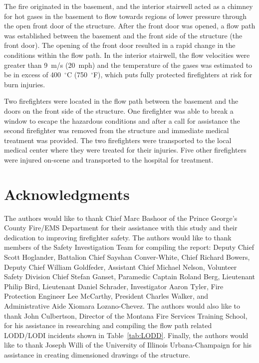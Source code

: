\documentclass[12pt,oneside]{book}
\begin{document}
The fire originated in the basement, and the interior stairwell acted as a chimney for hot gases in the basement to flow towards regions of lower pressure through the open front door of the structure. After the front door was opened, a flow path was established between the basement and the front side of the structure (the front door). The opening of the front door resulted in a rapid change in the conditions within the flow path. In the interior stairwell, the flow velocities were greater than 9~m/s (20~mph) and the temperature of the gases was estimated to be in excess of 400~$^{\circ}$C (750~$^{\circ}$F), which puts fully protected firefighters at risk for burn injuries.

Two firefighters were located in the flow path between the basement and the doors on the front side of the structure. One firefighter was able to break a window to escape the hazardous conditions and after a call for assistance the second firefighter was removed from the structure and immediate medical treatment was provided. The two firefighters were transported to the local medical center where they were treated for their injuries. Five other firefighters were injured on-scene and transported to the hospital for treatment.

\chapter{Acknowledgments}

The authors would like to thank Chief Marc Bashoor of the Prince George's County Fire/EMS Department for their assistance with this study and their dedication to improving firefighter safety. The authors would like to thank members of the Safety Investigation Team for compiling the report: Deputy Chief Scott Hoglander, Battalion Chief Sayshan Conver-White, Chief Richard Bowers, Deputy Chief William Goldfeder, Assistant Chief Michael Nelson, Volunteer Safety Division Chief Stefan Ganset, Paramedic Captain Roland Berg, Lieutenant Philip Bird, Lieutenant Daniel Schrader, Investigator Aaron Tyler, Fire Protection Engineer Lee McCarthy, President Charles Walker, and Administrative Aide Xiomara Lozano-Chevez. The authors would also like to thank John Culbertson, Director of the Montana Fire Services Training School, for his assistance in researching and compiling the flow path related LODD/LODI incidents shown in Table~\ref{tab:LODD}. Finally, the authors would like to thank Joseph Willi of the University of Illinois Urbana-Champaign for his assistance in creating dimensioned drawings of the structure.
\end{document}
